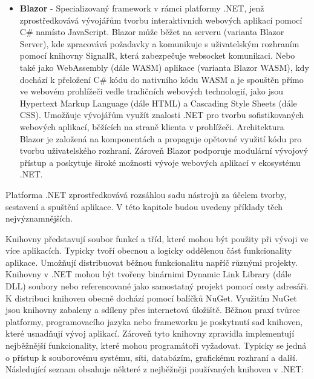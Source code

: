 \begin{itemize}
    \item \textbf{Blazor} - Specializovaný framework v rámci platformy .NET, jenž zprostředkovává vývojářům tvorbu interaktivních webových aplikací pomocí C\# namísto JavaScript. Blazor může běžet na serveru (varianta Blazor Server), kde zpracovává požadavky a komunikuje s uživatelským rozhraním pomocí knihovny SignalR, která zabezpečuje websocket komunikaci. Nebo také jako WebAssembly (dále WASM) aplikace (varianta Blazor WASM), kdy dochází k přeložení C\# kódu do nativního kódu WASM a je spouštěn přímo ve webovém prohlížeči vedle tradičních webových technologií, jako jsou Hypertext Markup Language (dále HTML) a Cascading Style Sheets (dále CSS). \cite{Price2023c8} Umožňuje vývojářům využít znalosti .NET pro tvorbu sofistikovaných webových aplikací, běžících na straně klienta v prohlížeči. Architektura Blazor je založená na komponentách a propaguje opětovné využití kódu pro tvorbu uživatelského rozhraní. Zároveň Blazor podporuje modulární vývojový přístup a poskytuje široké možnosti vývoje webových aplikací v ekosystému .NET.
\end{itemize}


Platforma .NET zprostředkovává rozsáhlou sadu nástrojů za účelem tvorby, sestavení a spuštění aplikace. V této kapitole budou uvedeny příklady těch nejvýznamnějších.


Knihovny představují soubor funkcí a tříd, které mohou být použity při vývoji ve více aplikacích. Typicky tvoří obecnou a logicky oddělenou část funkcionality aplikace. Umožňují distribuovat běžnou funkcionalitu napříč různými projekty. \cite{Price2023c8}  Knihovny v .NET mohou být tvořeny binárnimi Dynamic Link Library (dále DLL) soubory nebo referencované jako samostatný projekt pomocí cesty adresáři. K distribuci knihoven obecně dochází pomocí balíčků NuGet. Využitím NuGet jsou knihovny zabaleny a sdíleny přes internetová úložiště. Běžnou praxí tvůrce platformy, programovacího jazyka nebo frameworku je poskytnutí sad knihoven, které usnadňují vývoj aplikací. Zároveň tyto knihovny zpravidla implementují nejběžnější funkcionality, které mohou programátoři vyžadovat. Typicky se jedná o přístup k souborovému systému, síti, databázím, grafickému rozhraní a další. Následující seznam obsahuje některé z nejběžněji používaných knihoven v .NET:

